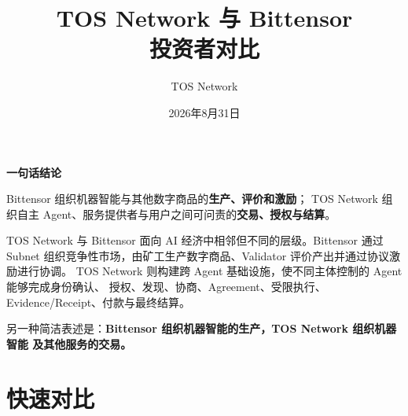 \documentclass[UTF8,11pt,fontset=fandol]{ctexart}
\title{\bfseries TOS Network 与 Bittensor\\[0.35em]
\Large 投资者对比}
\author{TOS Network}
\date{2026年8月31日}
\begin{document}
\maketitle

\begin{center}
\colorbox{toslight}{\parbox{0.9\textwidth}{
\centering
\textbf{一句话结论}\par
\vspace{0.35em}
Bittensor 组织机器智能与其他数字商品的\textbf{生产、评价和激励}；
TOS Network 组织自主 Agent、服务提供者与用户之间可问责的\textbf{交易、授权与结算}。
}}
\end{center}

\vspace{0.8em}

TOS Network 与 Bittensor 面向 AI 经济中相邻但不同的层级。Bittensor 通过 Subnet
组织竞争性市场，由矿工生产数字商品、Validator 评价产出并通过协议激励进行协调。
TOS Network 则构建跨 Agent 基础设施，使不同主体控制的 Agent 能够完成身份确认、
授权、发现、协商、Agreement、受限执行、Evidence/Receipt、付款与最终结算。

另一种简洁表述是：\textbf{Bittensor 组织机器智能的生产，TOS Network 组织机器智能
及其他服务的交易。}

\tableofcontents
\newpage

\section{快速对比}
\end{document}
